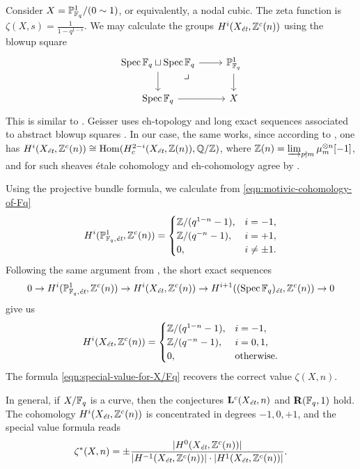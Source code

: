 \documentclass{article}
\numberwithin{equation}{section}
\begin{document}
\begin{example}
  Consider $X = \PP^1_{\FF_q}/(0\sim 1)$, or equivalently, a nodal cubic.
  The zeta function is $\zeta (X,s) = \frac{1}{1 - q^{1-s}}$.  We may calculate
  the groups $H^i (X_\et, \ZZ^c (n))$ using the blowup square
  \[ \begin{tikzcd}
      \Spec \FF_q \sqcup \Spec \FF_q \ar{r}\ar{d}\tikzpb & \PP^1_{\FF_q} \ar{d} \\
      \Spec \FF_q \ar{r} & X
    \end{tikzcd} \]
  This is similar to \cite[\S 8, Example~2]{Geisser-2006}. Geisser uses
  eh-topology and long exact sequences associated to abstract blowup squares
  \cite[Proposition~3.2]{Geisser-2006}. In our case, the same works, since
  according to \cite[Theorem~I]{Beshenov-Weil-etale-1}, one has
  $H^i (X_\et, \ZZ^c (n)) \cong \Hom (H^{2-i}_c (X_\et, \ZZ (n)),\QQ/\ZZ)$,
  where $\ZZ (n) = \varinjlim_{p\nmid m} \mu_m^{\otimes n} [-1]$, and
  for such sheaves étale cohomology and eh-cohomology agree by
  \cite[Theorem~3.6]{Geisser-2006}.

  Using the projective bundle formula, we calculate from
  \eqref{eqn:motivic-cohomology-of-Fq}
  \[ H^i (\PP^1_{\FF_q,\et}, \ZZ^c (n)) = \begin{cases}
      \ZZ/(q^{1-n} - 1), & i = -1, \\
      \ZZ/(q^{-n} - 1), & i = +1, \\
      0, & i \ne \pm 1.
    \end{cases} \]
  Following the same argument from \cite[\S 8, Example~2]{Geisser-2006},
  the short exact sequences
  \[ 0 \to H^i (\PP^1_{\FF_q,\et}, \ZZ^c (n)) \to
    H^i (X_\et, \ZZ^c (n)) \to
    H^{i+1} ((\Spec \FF_q)_\et, \ZZ^c (n)) \to 0 \]
  give us
  \[ H^i (X_\et, \ZZ^c (n)) = \begin{cases}
      \ZZ/(q^{1-n} - 1), & i = -1, \\
      \ZZ/(q^{-n} - 1), & i = 0,1, \\
      0, & \text{otherwise}.
    \end{cases} \]
  The formula \eqref{eqn:special-value-for-X/Fq} recovers the correct value
  $\zeta (X,n)$.
\end{example}

\begin{example}
  In general, if $X/\FF_q$ is a curve, then the conjectures
  $\mathbf{L}^c (X_\et,n)$ and $\mathbf{R} (\FF_q,1)$ hold.
  The cohomology $H^i (X_\et, \ZZ^c(n))$ is concentrated in degrees $-1, 0, +1$,
  and the special value formula reads
  \[ \zeta^* (X,n) =
    \pm \frac{|H^0 (X_\et, \ZZ^c (n))|}{|H^{-1} (X_\et, \ZZ^c (n))|\cdot |H^1 (X_\et, \ZZ^c (n))|}. \]
\end{example}
\end{document}
